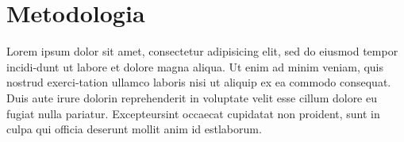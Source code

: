 \section{Metodologia}


Lorem ipsum dolor sit amet, consectetur adipisicing elit, sed do eiusmod tempor incidi-dunt ut labore et dolore magna aliqua.  Ut enim ad minim veniam, quis nostrud exerci-tation ullamco laboris nisi ut aliquip ex ea commodo consequat.  Duis aute irure dolorin reprehenderit in voluptate velit esse cillum dolore eu fugiat nulla pariatur.  Excepteursint occaecat cupidatat non proident, sunt in culpa qui officia deserunt mollit anim id estlaborum.